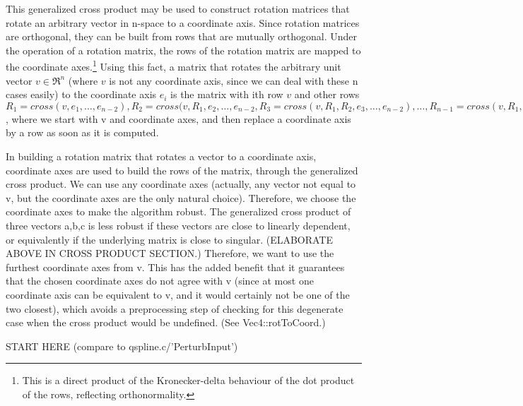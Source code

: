 \documentclass[12pt]{article}
\begin{document}
This generalized cross product may be used to construct rotation matrices
that rotate an arbitrary vector in n-space to a coordinate axis.
Since rotation matrices are orthogonal, they can be built from rows that
are mutually orthogonal.
Under the operation of a rotation matrix, 
the rows of the rotation matrix are mapped to the coordinate axes.\footnote{This
   is a direct product of the Kronecker-delta behaviour of the dot product of the rows,
   reflecting orthonormality.}
Using this fact, a matrix that rotates the arbitrary unit vector $v \in \Re^n$ 
(where $v$ is not any coordinate axis, since we can deal with these n cases easily)
to the coordinate axis $e_i$ is the matrix with ith row $v$ and other rows
$R_1 = cross (v,e_1,\ldots,e_{n-2}), R_2 = cross(v,R_1,e_2,\ldots,e_{n-2}, 
R_3 = cross (v,R_1,R_2, e_3, \ldots, e_{n-2}), \ldots, 
R_{n-1} = cross (v,R_1,\ldots,R_{n-2})$,
where we start with v and coordinate axes, and then replace a coordinate axis
by a row as soon as it is computed.

    In building a rotation matrix that rotates a vector to a coordinate axis,
    coordinate axes are used to build the rows of the matrix, through the
    generalized cross product.  We can use any coordinate axes (actually,
    any vector not equal to v, but the coordinate axes are the only natural choice).  
    Therefore, we choose the coordinate axes to make the algorithm robust.
    The generalized cross product of three vectors
    a,b,c is less robust if these vectors are close to linearly dependent,
    or equivalently if the underlying matrix is close to singular. (ELABORATE ABOVE
    IN CROSS PRODUCT SECTION.)
    Therefore, we want to use the furthest coordinate axes from v.
    This has the added benefit that it guarantees that the chosen coordinate axes
    do not agree with v (since at most one coordinate axis can be equivalent to v,
    and it would certainly not be one of the two closest), which avoids
    a preprocessing step of checking for this degenerate case when the
    cross product would be undefined.
    (See Vec4::rotToCoord.)

START HERE (compare to qspline.c/'PerturbInput')
\end{document}

